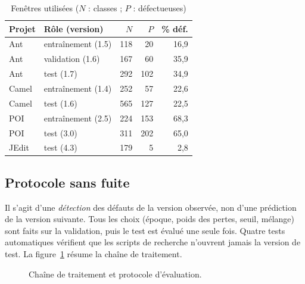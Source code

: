 \documentclass[conference,a4paper]{IEEEtran}
\newcommand{\subsect}[1]{\subsection{\textcolor{ieeeblue}{#1}}}
\begin{document}
\begin{table}[t]
\centering
\caption{Fenêtres utilisées ($N$ : classes ; $P$ : défectueuses)}
\label{tab:data}
\footnotesize
\begin{tabular}{@{}llrrr@{}}
\toprule
Projet & Rôle (version) & $N$ & $P$ & \% déf. \\
\midrule
Ant   & entraînement (1.5) & 118 & 20  & 16,9 \\
Ant   & validation (1.6)   & 167 & 60  & 35,9 \\
Ant   & test (1.7)         & 292 & 102 & 34,9 \\
Camel & entraînement (1.4) & 252 & 57  & 22,6 \\
Camel & test (1.6)         & 565 & 127 & 22,5 \\
POI   & entraînement (2.5) & 224 & 153 & 68,3 \\
POI   & test (3.0)         & 311 & 202 & 65,0 \\
JEdit & test (4.3)         & 179 & 5   & 2,8 \\
\bottomrule
\end{tabular}
\end{table}

\subsect{Protocole sans fuite}
Il s'agit d'une \emph{détection} des défauts de la version observée, non d'une prédiction de la version suivante. Tous
les choix (époque, poids des pertes, seuil, mélange) sont faits sur la validation, puis le test est évalué une seule fois.
Quatre tests automatiques vérifient que les scripts de recherche n'ouvrent jamais la version de test. La
figure~\ref{fig:pipeline} résume la chaîne de traitement.

\begin{figure}[t]
\centering
{}
\caption{Chaîne de traitement et protocole d'évaluation.}
\label{fig:pipeline}
\end{figure}
\end{document}

